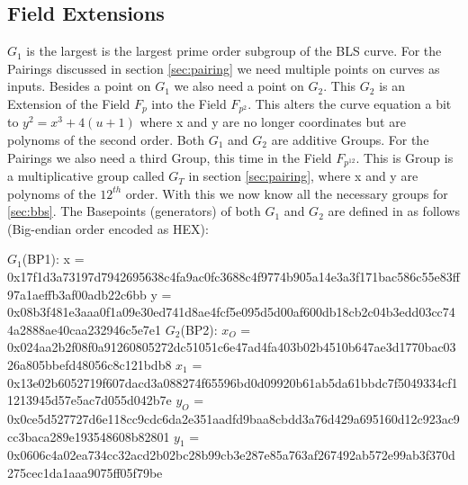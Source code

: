 \documentclass[
	a4paper               %
	,bibliography=totoc   %
	,listof=totoc         %
	,monolingual
]{bfhthesis}              %
\begin{document}
\subsection{Field Extensions}
$G_1$ is the largest is the largest prime order subgroup of the BLS curve.
For the Pairings discussed in section \ref{sec:pairing} we need multiple points on curves as inputs.
Besides a point on $G_1$ we also need a point on $G_2$.
This $G_2$ is an Extension of the Field $F_p$ into the Field $F_{p^2}$.
This alters the curve equation a bit to $y^2 = x^3 + 4(u + 1)$ where x and y are no longer coordinates but are polynoms of the second order.
Both $G_1$ and $G_2$ are additive Groups.
For the Pairings we also need a third Group, this time in the Field $F_{p^{12}}$.
This is Group is a multiplicative group called $G_T$ in section \ref{sec:pairing}, where x and y are polynoms of the $12^{th}$ order.
With this we now know all the necessary groups for \ref{sec:bbs}.
The Basepoints (generators) of both $G_1$ and $G_2$ are defined in \cite{pairing-friendly-curves} as follows (Big-endian order encoded as HEX):\newline

\boldmath$G_1$(BP1):\newline
x = 0x17f1d3a73197d7942695638c4fa9ac0fc3688c4f9774b905a14e3a3f171bac586c55e83ff97a1aeffb3af00adb22c6bb
y = 0x08b3f481e3aaa0f1a09e30ed741d8ae4fcf5e095d5d00af600db18cb2c04b3edd03cc744a2888ae40caa232946c5e7e1\newline\newline
\boldmath$G_2$(BP2):\newline
$x_O$ = 0x024aa2b2f08f0a91260805272dc51051c6e47ad4fa403b02b4510b647ae3d1770bac0326a805bbefd48056c8c121bdb8
$x_1$ = 0x13e02b6052719f607dacd3a088274f65596bd0d09920b61ab5da61bbdc7f5049334cf11213945d57e5ac7d055d042b7e
$y_O$ = 0x0ce5d527727d6e118cc9cdc6da2e351aadfd9baa8cbdd3a76d429a695160d12c923ac9cc3baca289e193548608b82801
$y_1$ = 0x0606c4a02ea734cc32acd2b02bc28b99cb3e287e85a763af267492ab572e99ab3f370d275cec1da1aaa9075ff05f79be
\end{document}
